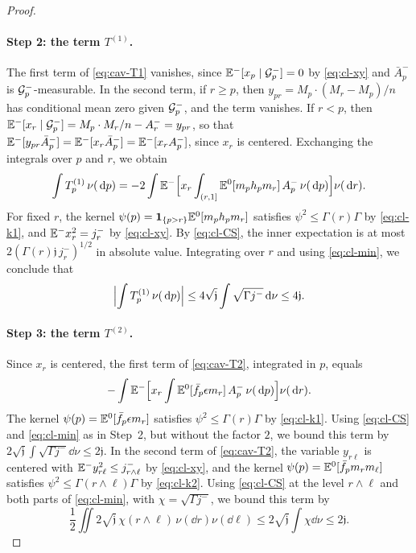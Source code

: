 \begin{proof}
\paragraph{Step 2: the term $T^{(1)}$.}
The first term of \eqref{eq:cav-T1} vanishes, since
$\mathbb E^-[x_p\mid\mathcal G_p^-]=0$ by \eqref{eq:cl-xy} and $\bar A_p^-$ is
$\mathcal G_p^-$-measurable. In the second term, if $r\ge p$, then
$y_{pr}=M_p\cdot(M_r-M_p)/n$ has conditional mean zero given
$\mathcal G^-_p$, and the term vanishes. If $r<p$, then
$\mathbb E^-[x_r\mid\mathcal G_p^-]=M_p\cdot M_r/n-A_r^-=y_{pr}$, so that
$\mathbb E^-[y_{pr}\bar A_p^-]=\mathbb E^-[x_r\bar A_p^-]=\mathbb E^-[x_rA_p^-]$, since
$x_r$ is centered. Exchanging the integrals over $p$ and $r$, we obtain
\[
 \int T_p^{(1)}\,\nu(\,\mathrm d p)
 =-2\int\mathbb E^-\Bigl[x_r\int_{(r,1]}\mathbb E^0[m_ph_pm_r]\,A_p^-\,\nu(\,\mathrm d p)\Bigr]
   \nu(\,\mathrm d r).
\]
For fixed $r$, the kernel $\psi(p)=\mathbf1_{\{p>r\}}\mathbb E^0[m_ph_pm_r]$
satisfies $\psi^2\le\Gamma(r)\Gamma$ by \eqref{eq:cl-k1}, and
$\mathbb E^-x_r^2=j_r^-$ by \eqref{eq:cl-xy}. By \eqref{eq:cl-CS}, the inner
expectation is at most $2(\Gamma(r)\mathfrak j\,j_r^-)^{1/2}$ in
absolute value. Integrating over $r$ and using \eqref{eq:cl-min}, we
conclude that
\[
 \Bigl|\int T_p^{(1)}\,\nu(\,\mathrm d p)\Bigr|
 \le4\sqrt{\mathfrak j}\int\sqrt{\Gamma j^-}\,\mathrm d\nu\le4\mathfrak j.
\]

\paragraph{Step 3: the term $T^{(2)}$.}
Since $x_r$ is centered, the first term of \eqref{eq:cav-T2},
integrated in $p$, equals
\[
 -\int\mathbb E^-\Bigl[x_r\int\mathbb E^0[\bar f_p\epsilon m_r]\,A_p^-\,\nu(\,\mathrm d p)\Bigr]
 \nu(\,\mathrm d r).
\]
The kernel $\psi(p)=\mathbb E^0[\bar f_p\epsilon m_r]$ satisfies
$\psi^2\le\Gamma(r)\Gamma$ by \eqref{eq:cl-k1}. Using \eqref{eq:cl-CS} and \eqref{eq:cl-min} as in Step~2, but
without the factor $2$, we bound
this term by $2\sqrt{\mathfrak j}\int\sqrt{\Gamma j^-}\dd\nu
\le2\mathfrak j$. In the second term of \eqref{eq:cav-T2}, the variable
$y_{r\ell}$ is centered with $\mathbb E^-y_{r\ell}^2\le j^-_{r\wedge\ell}$ by
\eqref{eq:cl-xy}, and the kernel $\psi(p)=\mathbb E^0[\bar f_pm_rm_\ell]$
satisfies $\psi^2\le\Gamma(r\wedge\ell)\Gamma$ by \eqref{eq:cl-k2}.
Using \eqref{eq:cl-CS} at the level $r\wedge\ell$ and both parts of
\eqref{eq:cl-min}, with $\chi=\sqrt{\Gamma j^-}$, we bound this term
by
\[
 \frac12\iint2\sqrt{\mathfrak j}\,\chi(r\wedge\ell)\,
 \nu(\dd r)\nu(\dd\ell)
 \le2\sqrt{\mathfrak j}\int\chi\dd\nu\le2\mathfrak j.
\]


\end{proof}
